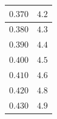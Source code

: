 \documentclass[letterpaper, 12pt]{article}
\begin{document}
\begin{longtable}{|c|c|}
    \hline
    $0.370$                                                                                                                                                                     & $4.2$                                                                                                                                                                                  \\
    \hline
    $0.380$                                                                                                                                                                     & $4.3$                                                                                                                                                                                  \\
    \hline
    $0.390$                                                                                                                                                                     & $4.4$                                                                                                                                                                                  \\
    \hline
    $0.400$                                                                                                                                                                     & $4.5$                                                                                                                                                                                  \\
    \hline
    $0.410$                                                                                                                                                                     & $4.6$                                                                                                                                                                                  \\
    \hline
    $0.420$                                                                                                                                                                     & $4.8$                                                                                                                                                                                  \\
    \hline
    $0.430$                                                                                                                                                                     & $4.9$                                                                                                                                                                                  \\

\end{longtable}
\end{document}
